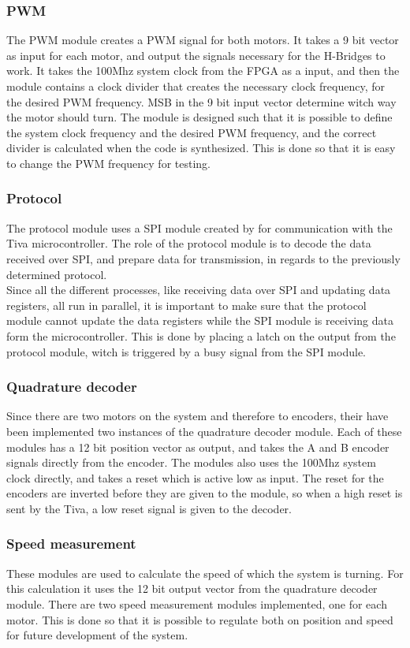 \documentclass[../../../main]{subfiles}
\begin{document}
\subsubsection{PWM}
The PWM module creates a PWM signal for both motors. It takes a 9 bit vector as input for each motor, and output the signals necessary for the H-Bridges to work.
It takes the 100Mhz system clock from the FPGA as a input, and then the module contains a clock divider that creates the necessary clock frequency, for the desired PWM frequency.
MSB in the 9 bit input vector determine witch way the motor should turn.
The module is designed such that it is possible to define the system clock frequency and the desired PWM frequency, and the correct divider is calculated when the code is synthesized.
This is done so that it is easy to change the PWM frequency for testing.
\subsubsection{Protocol}
The protocol module uses a SPI module created by  for communication with the Tiva microcontroller. 
The role of the protocol module is to decode the data received over SPI, and prepare data for transmission, in regards to the previously determined protocol.
\\
Since all the different processes, like receiving data over SPI and updating data registers, all run in parallel, it is important to make sure that the protocol module cannot update the data registers while the SPI module is receiving data form the microcontroller.
This is done by placing a latch on the output from the protocol module, witch is triggered by a busy signal from the SPI module.

\subsubsection{Quadrature decoder}
\label{subsubsec:Qdecoder_implement}
Since there are two motors on the system and therefore to encoders, their have been implemented two instances of the quadrature decoder module.
Each of these modules has a 12 bit position vector as output, and takes the A and B encoder signals directly from the encoder. The modules also uses the 100Mhz system clock directly, and takes a reset which is active low as input.
The reset for the encoders are inverted before they are given to the module, so when a high reset is sent by the Tiva, a low reset signal is given to the decoder.


\subsubsection{Speed measurement}
These modules are used to calculate the speed of which the system is turning. For this calculation it uses the 12 bit output vector from the quadrature decoder module.
There are two speed measurement modules implemented, one for each motor.
This is done so that it is possible to regulate both on position and speed for future development of the system.
\end{document}
